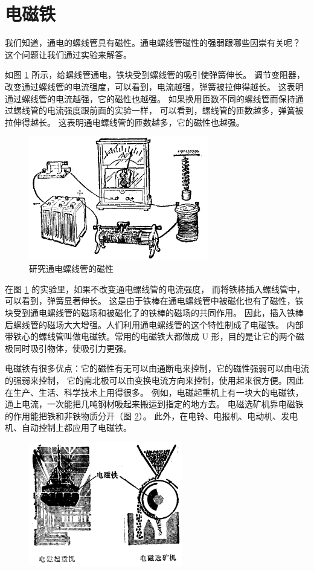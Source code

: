 \section{电磁铁}\label{sec:10-5}

我们知道，通电的螺线管具有磁性。通电螺线管磁性的强弱跟哪些因崇有关呢？
这个问题让我们通过实验来解答。

如图 \ref{fig:10-28} 所示，给螺线管通电，铁块受到螺线管的吸引使弹簧伸长。
调节变阻器，改变通过螺线管的电流强度，可以看到，电流越强，弹簧被拉伸得越长。
这表明通过螺线管的电流越强，它的磁性也越强。
如果换用匝数不同的螺线管而保持通过螺线管的电流强度跟前面的实验一样，
可以看到，螺线管的匝数越多，弹簧被拉伸得越长。
这表明通电螺线管的匝数越多，它的磁性也越强。

\begin{figure}[htbp]
    \centering
    \includegraphics[width=0.7\textwidth]{../pic/czwl2-ch10-28}
    \caption{研究通电螺线管的磁性}\label{fig:10-28}
\end{figure}

在图 \ref{fig:10-28} 的实验里，如果不改变通电螺线管的电流强度，
而将铁棒插入螺线管中，可以看到，弹簧显著伸长。
这是由于铁棒在通电螺线管中被磁化也有了磁性，铁块受到通电螺线管的磁场和被磁化了的铁棒的磁场的共同作用。
因此，插入铁棒后螺线管的磁场大大增强。人们利用通电螺线管的这个特性制成了电磁铁。
内部带铁心的螺线管叫做电磁铁。常用的电磁铁大都做成 U 形，目的是让它的两个磁极同时吸引物体，使吸引力更强。

电磁铁有很多优点：它的磁性有无可以由通断电来控制，它的磁性强弱可以由电流的强弱来控制，
它的南北极可以由变换电流方向来控制，使用起来很方便。因此在生产、生活、科学技术上用得很多。
例如，电磁起重机上有一块大的电磁铁，通上电流，一次能把几吨钢材吸起来搬运到指定的地方去。
电磁选矿机靠电磁铁的作用能把铁和非铁物质分开（图 \ref{fig:10-29}）。
此外，在电铃、电报机、电动机、发电机、自动控制上都应用了电磁铁。

\begin{figure}[htbp]
    \centering
    \includegraphics[width=0.6\textwidth]{../pic/czwl2-ch10-29}
    \caption{}\label{fig:10-29}
\end{figure}


